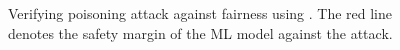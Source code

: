 \begin{figure}
	\centering
	
	\caption[Verifying fairness attacks]{Verifying poisoning attack against fairness using {\fvgm}. The red line denotes the safety margin of the ML model against the attack.}\label{fvgm_fig:fairness_attacks}
\end{figure}


